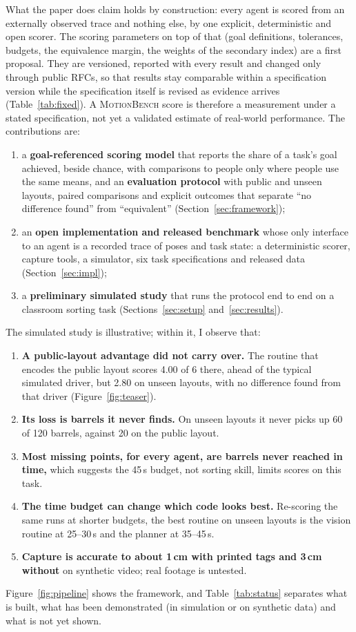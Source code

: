 \documentclass[11pt]{article}
\newcommand{\mb}{\textsc{MotionBench}}
\begin{document}
What the paper does claim holds by construction: every agent is scored from an externally observed
trace and nothing else, by one explicit, deterministic and open scorer. The scoring parameters on top
of that (goal definitions, tolerances, budgets, the equivalence margin, the weights of the secondary
index) are a first proposal. They are versioned, reported with every result and changed only through
public RFCs, so that results stay comparable within a specification version while the specification
itself is revised as evidence arrives (Table~\ref{tab:fixed}). A \mb{} score is therefore a measurement
under a stated specification, not yet a validated estimate of real-world performance. The
contributions are:
\begin{enumerate}
  \item a \textbf{goal-referenced scoring model} that reports the share of a task's goal achieved,
    beside chance, with comparisons to people only where people use the same means, and an
    \textbf{evaluation protocol} with public and unseen layouts, paired comparisons and explicit
    outcomes that separate ``no difference found'' from ``equivalent'' (Section~\ref{sec:framework});
  \item an \textbf{open implementation and released benchmark} whose only interface to an agent is a
    recorded trace of poses and task state: a deterministic scorer, capture tools, a simulator, six
    task specifications and released data (Section~\ref{sec:impl});
  \item a \textbf{preliminary simulated study} that runs the protocol end to end on a classroom
    sorting task (Sections~\ref{sec:setup} and~\ref{sec:results}).
\end{enumerate}
The simulated study is illustrative; within it, I observe that:
\begin{enumerate}[label=(\arabic*)]
  \item \textbf{A public-layout advantage did not carry over.} The routine that encodes the public
    layout scores 4.00 of 6 there, ahead of the typical simulated driver, but 2.80 on unseen layouts,
    with no difference found from that driver (Figure~\ref{fig:teaser}).
  \item \textbf{Its loss is barrels it never finds.} On unseen layouts it never picks up 60 of 120
    barrels, against 20 on the public layout.
  \item \textbf{Most missing points, for every agent, are barrels never reached in time,} which
    suggests the 45\,s budget, not sorting skill, limits scores on this task.
  \item \textbf{The time budget can change which code looks best.} Re-scoring the same runs at
    shorter budgets, the best routine on unseen layouts is the vision routine at 25--30\,s and the
    planner at 35--45\,s.
  \item \textbf{Capture is accurate to about 1\,cm with printed tags and 3\,cm without} on synthetic
    video; real footage is untested.
\end{enumerate}
Figure~\ref{fig:pipeline} shows the framework, and Table~\ref{tab:status} separates what is built,
what has been demonstrated (in simulation or on synthetic data) and what is not yet shown.
\end{document}
